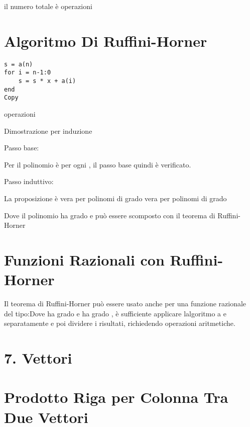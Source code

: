 \documentclass[
]{article}
\begin{document}
il numero totale è {} operazioni

\hypertarget{algoritmo-di-ruffini-horner}{%
\section{Algoritmo Di
Ruffini-Horner}\label{algoritmo-di-ruffini-horner}}

{}

{}

{}

{}

{}

\begin{verbatim}
s = a(n)
for i = n-1:0
    s = s * x + a(i)
end
Copy
\end{verbatim}

{} operazioni

Dimostrazione per induzione

Passo base:

Per {} il polinomio è {} per ogni {}, il passo base quindi è verificato.

Passo induttivo:

La proposizione è vera per polinomi di grado {} vera per polinomi di
grado {}

{}Dove il polinomio {} ha grado {} e può essere scomposto con il teorema
di Ruffini-Horner

\hypertarget{funzioni-razionali-con-ruffini-horner}{%
\section{Funzioni Razionali con
Ruffini-Horner}\label{funzioni-razionali-con-ruffini-horner}}

Il teorema di Ruffini-Horner può essere usato anche per una funzione
razionale del tipo:{}Dove {} ha grado {} e {} ha grado {}, è sufficiente
applicare l\textquotesingle algoritmo a {} e {} separatamente e poi
dividere i risultati, richiedendo {} operazioni aritmetiche.

\hypertarget{vettori}{%
\section{7. Vettori}\label{vettori}}

{}

{}

{}

{}

\hypertarget{prodotto-riga-per-colonna-tra-due-vettori}{%
\section{Prodotto Riga per Colonna Tra Due
Vettori}\label{prodotto-riga-per-colonna-tra-due-vettori}}
\end{document}
